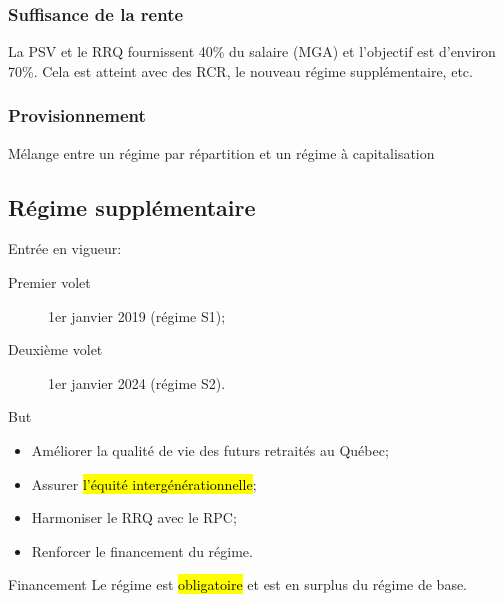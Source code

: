 \documentclass[10pt, french]{article}
\begin{document}
\begin{multicols*}{3}
\subsubsection*{Suffisance de la rente}
La PSV et le RRQ fournissent 40\% du salaire (MGA) et l'objectif est d'environ 70\%. Cela est atteint avec des RCR, le nouveau régime supplémentaire, etc.

\subsubsection*{Provisionnement}
Mélange entre un régime par répartition et un régime à capitalisation

\columnbreak

\subsection*{Régime supplémentaire}
\begin{rappel_enhanced}[Historique]
Entrée en vigueur:
\begin{description}
	\item[Premier volet]	1er janvier 2019 (régime S1);
	\item[Deuxième volet]	1er janvier 2024	(régime S2).
\end{description}
\end{rappel_enhanced}

\begin{conceptgen}{But}
\begin{itemize}[leftmargin = *]
	\item	Améliorer la qualité de vie des futurs retraités au Québec;
	\item	Assurer \hl{l'équité intergénérationnelle};
	\item	Harmoniser le RRQ avec le RPC;
	\item	Renforcer le financement du régime.
\end{itemize}
\end{conceptgen}

\begin{conceptgen}{Financement}
Le régime est \hl{obligatoire} et est en surplus du régime de base.


\end{conceptgen}
\end{multicols*}
\end{document}
